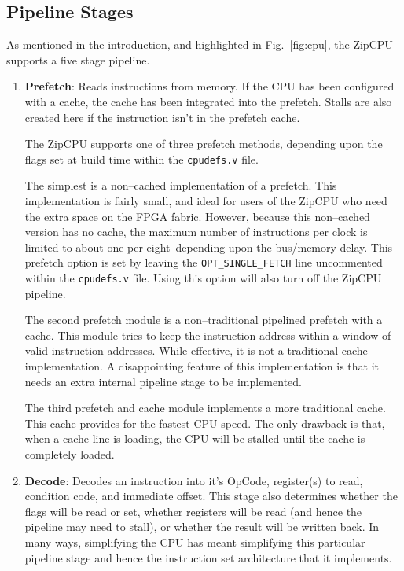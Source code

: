 \documentclass{gqtekspec}
\begin{document}
\subsection{Pipeline Stages}
As mentioned in the introduction, and highlighted in Fig.~\ref{fig:cpu},
the ZipCPU supports a five stage pipeline.
\begin{enumerate}
\item {\bf Prefetch}: Reads instructions from memory.  If the CPU has been 
	configured with a cache, the cache has been integrated into the
	prefetch.  Stalls are also created here if the instruction isn't
	in the prefetch cache.

	The ZipCPU supports one of three prefetch methods, depending upon the
	flags set at build time within the {\tt cpudefs.v} file. 

	The simplest
	is a non--cached implementation of a prefetch.  This implementation is
	fairly small, and ideal for users of the ZipCPU who need the extra
	space on the FPGA fabric.  However, because this non--cached version
	has no cache, the maximum number of instructions per clock is limited
	to about one per eight--depending upon the bus/memory delay.
	This prefetch option is set by leaving the {\tt OPT\_SINGLE\_FETCH}
	line uncommented within the {\tt cpudefs.v} file.  Using this option
	will also turn off the ZipCPU pipeline.

	The second prefetch module is a non--traditional pipelined prefetch
	with a cache.  This module tries to keep the instruction address
	within a window of valid instruction addresses.  While effective, it
	is not a traditional cache implementation.  A disappointing feature of
	this implementation is that it needs an extra internal pipeline stage
	to be implemented.

	The third prefetch and cache module implements a more traditional
	cache.  This cache provides for the fastest CPU speed.  The only
	drawback is that, when a cache line is loading, the CPU will be stalled
	until the cache is completely loaded.

\item {\bf Decode}: Decodes an instruction into it's OpCode, register(s) to
	read, condition code, and immediate offset.  This stage also
	determines whether the flags will be read or set, whether registers
	will be read (and hence the pipeline may need to stall), or whether the
	result will be written back.  In many ways, simplifying the CPU has
	meant simplifying this particular pipeline stage and hence the
	instruction set architecture that it implements.


\end{enumerate}
\end{document}
